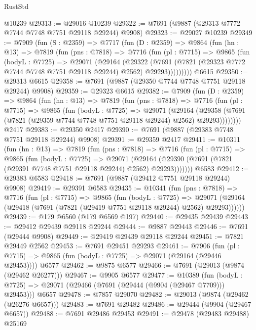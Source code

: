 \begin{lexlean}{RustStd}
\begin{coremodule}
    @10239
@29313 := @29016 @10239
@29322 := @7691 (@9887 (@29313 @7772 @7744 @7748 @7751 @29118 @29244) @9908)
@29323 := @29027 @10239
@29349 := @7909
    (fun (S : @2359) =>
    @7717
      (fun (D : @2359) =>
      @9864
        (fun (hn : @13) =>
        @7819
          (fun (pns : @7818) =>
          @7716
            (fun (pl : @7715) =>
            @9865
              (fun (bodyL : @7725) =>
              @29071
                (@29164
                  (@29322
                    (@7691
                      (@7821 (@29323 @7772 @7744 @7748 @7751 @29118 @29244) @2562)
                      @29293)))))))))
    @6615
@29350 := @29313 @6615
@29358 := @7691 (@9887 (@29350 @7744 @7748 @7751 @29118 @29244) @9908)
@29359 := @29323 @6615
@29382 := @7909
    (fun (D : @2359) =>
    @9864
      (fun (hn : @13) =>
      @7819
        (fun (pns : @7818) =>
        @7716
          (fun (pl : @7715) =>
          @9865
            (fun (bodyL : @7725) =>
            @29071
              (@29164
                (@29358 (@7691 (@7821 (@29359 @7744 @7748 @7751 @29118 @29244) @2562) @29293))))))))
    @2417
@29383 := @29350 @2417
@29390 := @7691 (@9887 (@29383 @7748 @7751 @29118 @29244) @9908)
@29391 := @29359 @2417
@29411 := @10311
    (fun (hn : @13) =>
    @7819
      (fun (pns : @7818) =>
      @7716
        (fun (pl : @7715) =>
        @9865
          (fun (bodyL : @7725) =>
          @29071
            (@29164 (@29390 (@7691 (@7821 (@29391 @7748 @7751 @29118 @29244) @2562) @29293)))))))
    @6583
@29412 := @29383 @6583
@29418 := @7691 (@9887 (@29412 @7751 @29118 @29244) @9908)
@29419 := @29391 @6583
@29435 := @10341
    (fun (pns : @7818) =>
    @7716
      (fun (pl : @7715) =>
      @9865
        (fun (bodyL : @7725) =>
        @29071 (@29164 (@29418 (@7691 (@7821 (@29419 @7751 @29118 @29244) @2562) @29293))))))
@29439 := @179 @6560 (@179 @6569 @197)
@29440 := @29435 @29439
@29443 := @29412 @29439 @29118 @29244
@29444 := @9887 @29443
@29446 := @7691 (@29444 @9908)
@29449 := @29419 @29439 @29118 @29244
@29451 := @7821 @29449 @2562
@29453 := @7691 @29451 @29293
@29461 := @7906
    (fun (pl : @7715) => @9865 (fun (bodyL : @7725) => @29071 (@29164 (@29446 @29453))))
    @6577
@29462 := @9875 @6577
@29466 := @7691 (@29013 (@9874 (@29462 @26277)))
@29467 := @9905 @6577
@29477 := @10389
    (fun (bodyL : @7725) => @29071 (@29466 (@7691 (@29444 (@9904 (@29467 @7709))) @29453)))
    @6657
@29478 := @7857 @29070
@29482 := @29013 (@9874 (@29462 (@26276 @6657)))
@29483 := @7691 @29482
@29486 := @29444 (@9904 (@29467 @6657))
@29488 := @7691 @29486 @29453
@29491 := @29478 (@29483 @29488) @25169

\end{coremodule}
\end{lexlean}
